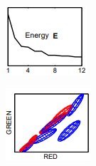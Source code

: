 \begin{figure}[H]
  \centering
    \begin{subfigure}{0.3\textwidth}
      \centering{}
      \includegraphics[width=\textwidth]{gambar/gambar-2_7(a).png}
      \caption{}
    \end{subfigure}%
    \begin{subfigure}{0.3\textwidth}
      \centering{}
      \includegraphics[width=\textwidth]{gambar/gambar-2_7(b).png}
      \caption{}
    \end{subfigure}  

\end{figure}
